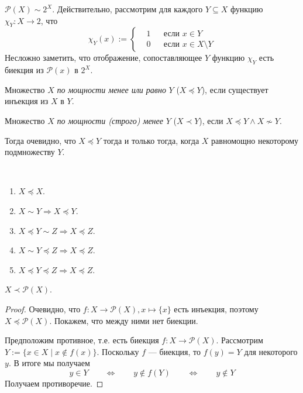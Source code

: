 \documentclass[12pt,a4paper]{article}
\newcommand{\subsets}{\ensuremath{\mathcal{P}}\xspace}
\begin{document}
    \begin{example}
        $\subsets(X) \sim 2^X$. Действительно, рассмотрим для каждого $Y \subseteq X$ функцию $\chi_Y: X \to 2$, что
        \[\chi_Y(x) := \left\{\begin{aligned}
            &1 && \text{если $x\in Y$}\\
            &0 && \text{если $x \in X \setminus Y$}
        \end{aligned}\right.\]
        Несложно заметить, что отображение, сопоставляющее $Y$ функцию $\chi_Y$ есть биекция из $\subsets(x)$ в $2^X$.
    \end{example}

    \begin{definition}
        Множество $X$ \emph{по мощности менее или равно} $Y$ ($X \preccurlyeq Y$), если существует инъекция из $X$ в $Y$.

        Множество $X$ \emph{по мощности (строго) менее} $Y$ ($X \prec Y$), если $X \preccurlyeq Y \wedge X \nsim Y$.
    \end{definition}

    \begin{remark}
        Тогда очевидно, что $X \preccurlyeq Y$ тогда и только тогда, когда $X$ равномощно некоторому подмножеству $Y$.
    \end{remark}

    \begin{theorem}\ 
        \begin{enumerate}
            \item $X \preccurlyeq X$.
            \item $X \sim Y \Rightarrow X \preccurlyeq Y$.
            \item $X \preccurlyeq Y \sim Z \Rightarrow X \preccurlyeq Z$.
            \item $X \sim Y \preccurlyeq Z \Rightarrow X \preccurlyeq Z$.
            \item $X \preccurlyeq Y \preccurlyeq Z \Rightarrow X \preccurlyeq Z$.
        \end{enumerate}
    \end{theorem}

    \begin{theorem}
        $X \prec \subsets(X)$.
    \end{theorem}

    \begin{proof}
        Очевидно, что $f: X \to \subsets(X), x \mapsto \{x\}$ есть инъекция, поэтому $X \preccurlyeq \subsets(X)$. Покажем, что между ними нет биекции.

        Предположим противное, т.е. есть биекция $f: X \to \subsets(X)$. Рассмотрим $Y := \{x \in X \mid x \notin f(x)\}$. Поскольку $f$ --- биекция, то $f(y) = Y$ для некоторого $y$. В итоге мы получаем
        \[
            y \in Y \qquad
            \Longleftrightarrow \qquad
            y \notin f(Y) \qquad
            \Longleftrightarrow \qquad
            y \notin Y
        \]
        Получаем противоречие.
    \end{proof}
\end{document}
